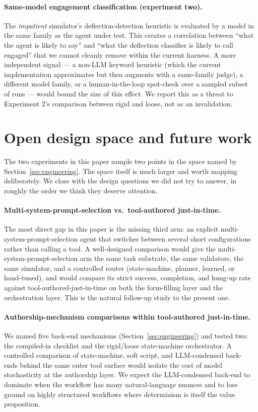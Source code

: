 \documentclass[11pt,a4paper]{article}
\begin{document}
\paragraph{Same-model engagement classification (experiment two).}
The \emph{impatient} simulator's deflection-detection heuristic is evaluated by a model in the same family as the agent under test. This creates a correlation between ``what the agent is likely to say'' and ``what the deflection classifier is likely to call engaged'' that we cannot cleanly remove within the current harness. A more independent signal --- a non-LLM keyword heuristic (which the current implementation approximates but then augments with a same-family judge), a different model family, or a human-in-the-loop spot-check over a sampled subset of runs --- would bound the size of this effect. We report this as a threat to Experiment 2's comparison between rigid and loose, not as an invalidation.

\section{Open design space and future work}
\label{sec:open-design-space}

The two experiments in this paper sample two points in the space named by Section~\ref{sec:engineering}. The space itself is much larger and worth mapping deliberately. We close with the design questions we did not try to answer, in roughly the order we think they deserve attention.

\paragraph{Multi-system-prompt-selection vs.\ tool-authored just-in-time.}
The most direct gap in this paper is the missing third arm: an explicit multi-system-prompt-selection agent that switches between several short configurations rather than calling a tool. A well-designed comparison would give the multi-system-prompt-selection arm the same task substrate, the same validators, the same simulator, and a controlled router (state-machine, planner, learned, or hand-tuned), and would compare its strict success, completion, and hung-up rate against tool-authored-just-in-time on both the form-filling layer and the orchestration layer. This is the natural follow-up study to the present one.

\paragraph{Authorship-mechanism comparisons within tool-authored just-in-time.}
We named five back-end mechanisms (Section~\ref{sec:engineering}) and tested two: the compiled-in checklist and the rigid/loose state-machine orchestrator. A controlled comparison of state-machine, soft script, and LLM-condensed back-ends behind the same outer tool surface would isolate the cost of model stochasticity at the authorship layer. We expect the LLM-condensed back-end to dominate when the workflow has many natural-language nuances and to lose ground on highly structured workflows where determinism is itself the value proposition.
\end{document}
